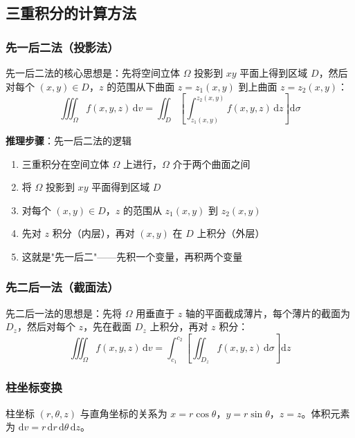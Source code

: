 \subsection{三重积分的计算方法}

\subsubsection{先一后二法（投影法）}

先一后二法的核心思想是：先将空间立体 $\Omega$ 投影到 $xy$ 平面上得到区域 $D$，然后对每个 $(x,y)\in D$，$z$ 的范围从下曲面 $z=z_1(x,y)$ 到上曲面 $z=z_2(x,y)$：
\[
\iiint_\Omega f(x,y,z)\,\mathrm{d}v = \iint_D \left[\int_{z_1(x,y)}^{z_2(x,y)} f(x,y,z)\,\mathrm{d}z\right]\mathrm{d}\sigma
\]

\begin{insightbox}
\textbf{推理步骤}：先一后二法的逻辑
\begin{enumerate}[leftmargin=2em]
    \item 三重积分在空间立体 $\Omega$ 上进行，$\Omega$ 介于两个曲面之间
    \item 将 $\Omega$ 投影到 $xy$ 平面得到区域 $D$
    \item 对每个 $(x,y)\in D$，$z$ 的范围从 $z_1(x,y)$ 到 $z_2(x,y)$
    \item 先对 $z$ 积分（内层），再对 $(x,y)$ 在 $D$ 上积分（外层）
    \item 这就是"先一后二"——先积一个变量，再积两个变量
\end{enumerate}
\end{insightbox}

\subsubsection{先二后一法（截面法）}

先二后一法的思想是：先将 $\Omega$ 用垂直于 $z$ 轴的平面截成薄片，每个薄片的截面为 $D_z$，然后对每个 $z$，先在截面 $D_z$ 上积分，再对 $z$ 积分：
\[
\iiint_\Omega f(x,y,z)\,\mathrm{d}v = \int_{c_1}^{c_2} \left[\iint_{D_z} f(x,y,z)\,\mathrm{d}\sigma\right]\mathrm{d}z
\]

\subsubsection{柱坐标变换}

柱坐标 $(r, \theta, z)$ 与直角坐标的关系为 $x=r\cos\theta$，$y=r\sin\theta$，$z=z$。体积元素为 $\mathrm{d}v = r\,\mathrm{d}r\,\mathrm{d}\theta\,\mathrm{d}z$。


